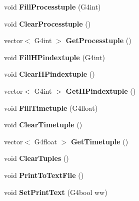 \begin{DoxyCompactItemize}
void {\bfseries Fill\+Processtuple} (G4int)
\item 
\hypertarget{class_run_action_ad9ec4b612f868a637439d9bfd202718e}{}\label{class_run_action_ad9ec4b612f868a637439d9bfd202718e} 
void {\bfseries Clear\+Processtuple} ()
\item 
\hypertarget{class_run_action_a71b916704ca6426977216462f28095b6}{}\label{class_run_action_a71b916704ca6426977216462f28095b6} 
vector$<$ G4int $>$ {\bfseries Get\+Processtuple} ()
\item 
\hypertarget{class_run_action_aeab6c951cff040fadf3d300688c71dfd}{}\label{class_run_action_aeab6c951cff040fadf3d300688c71dfd} 
void {\bfseries Fill\+H\+Pindextuple} (G4int)
\item 
\hypertarget{class_run_action_ab3ec784869516121cbe44441fc2a120f}{}\label{class_run_action_ab3ec784869516121cbe44441fc2a120f} 
void {\bfseries Clear\+H\+Pindextuple} ()
\item 
\hypertarget{class_run_action_a0e57eaa44f6d9ef3fd5f89b8329b6a47}{}\label{class_run_action_a0e57eaa44f6d9ef3fd5f89b8329b6a47} 
vector$<$ G4int $>$ {\bfseries Get\+H\+Pindextuple} ()
\item 
\hypertarget{class_run_action_ab9191245efd2c27359af39b4b49aecda}{}\label{class_run_action_ab9191245efd2c27359af39b4b49aecda} 
void {\bfseries Fill\+Timetuple} (G4float)
\item 
\hypertarget{class_run_action_a42f3946462307a31e3ab242ba9f505d7}{}\label{class_run_action_a42f3946462307a31e3ab242ba9f505d7} 
void {\bfseries Clear\+Timetuple} ()
\item 
\hypertarget{class_run_action_ab36878ce441870b15be540d75ccac111}{}\label{class_run_action_ab36878ce441870b15be540d75ccac111} 
vector$<$ G4float $>$ {\bfseries Get\+Timetuple} ()
\item 
\hypertarget{class_run_action_a53818e35d8573c09a776da5334110708}{}\label{class_run_action_a53818e35d8573c09a776da5334110708} 
void {\bfseries Clear\+Tuples} ()
\item 
\hypertarget{class_run_action_a84c5a2dee1853a81b1e1d9004c8c56eb}{}\label{class_run_action_a84c5a2dee1853a81b1e1d9004c8c56eb} 
void {\bfseries Print\+To\+Text\+File} ()
\item 
\hypertarget{class_run_action_ace47e962f16657971e9a3cb77ad10807}{}\label{class_run_action_ace47e962f16657971e9a3cb77ad10807} 
void {\bfseries Set\+Print\+Text} (G4bool ww)
\item 
\hypertarget{class_run_action_af0010d398d30d47cfb87db50b9705b59}{}\label{class_run_action_af0010d398d30d47cfb87db50b9705b59} 

\end{DoxyCompactItemize}

